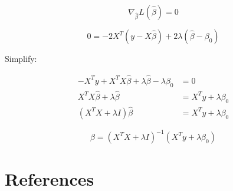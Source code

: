 \documentclass[
  12pt]{article}
\begin{document}
\[
\nabla_{\hat{\beta}} L(\hat{\beta}) = 0
\]

\[
0 = -2X^{T}(y - X\hat{\beta}) + 2\lambda(\hat{\beta} - \beta_0)
\]

Simplify:

\[
\begin{aligned}
- X^{T}y + X^{T}X\hat{\beta} + \lambda \hat{\beta} - \lambda \beta_0 &= 0 \\
X^TX\hat{\beta} + \lambda\hat{\beta} &= X^Ty + \lambda\beta_0 \\
(X^{T}X + \lambda I)\hat{\beta} &= X^{T}y + \lambda \beta_0
\end{aligned}
\]

\[
\boxed{
\hat{\beta} = (X^{T}X + \lambda I)^{-1}(X^{T}y + \lambda \beta_0)
}
\]

\section*{References}\label{references}

\renewcommand{\bibsection}{}

\end{document}
